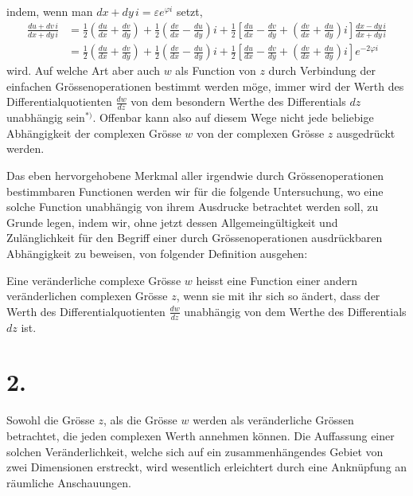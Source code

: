 \documentclass{article}
\begin{document}
indem, wenn man $dx + dy\,i = \varepsilon e^{\varphi i}$ setzt,
\[
\begin{aligned}
\frac{du + dv\,i}{dx + dy\,i} &= \frac{1}{2}\left(\frac{du}{dx} + \frac{dv}{dy}\right) + \frac{1}{2}\left(\frac{dv}{dx} - \frac{du}{dy}\right)i + \frac{1}{2}\left[\frac{du}{dx} - \frac{dv}{dy} + \left(\frac{dv}{dx} + \frac{du}{dy}\right)i\right]\frac{dx - dy\,i}{dx + dy\,i} \\
&= \frac{1}{2}\left(\frac{du}{dx} + \frac{dv}{dy}\right) + \frac{1}{2}\left(\frac{dv}{dx} - \frac{du}{dy}\right)i + \frac{1}{2}\left[\frac{du}{dx} - \frac{dv}{dy} + \left(\frac{dv}{dx} + \frac{du}{dy}\right)i\right]e^{-2\varphi i}
\end{aligned}
\]
wird. Auf welche Art aber auch $w$ als Function von $z$ durch Verbindung der einfachen Grössenoperationen bestimmt werden möge, immer wird der Werth des Differentialquotienten $\frac{dw}{dz}$ von dem besondern Werthe des Differentials $dz$ unabhängig sein${}^{*)}$. Offenbar kann also auf diesem Wege nicht jede beliebige Abhängigkeit der complexen Grösse $w$ von der complexen Grösse $z$ ausgedrückt werden.

Das eben hervorgehobene Merkmal aller irgendwie durch Grössenoperationen bestimmbaren Functionen werden wir für die folgende Untersuchung, wo eine solche Function unabhängig von ihrem Ausdrucke betrachtet werden soll, zu Grunde legen, indem wir, ohne jetzt dessen Allgemeingültigkeit und Zulänglichkeit für den Begriff einer durch Grössenoperationen ausdrückbaren Abhängigkeit zu beweisen, von folgender Definition ausgehen:

Eine veränderliche complexe Grösse $w$ heisst eine Function einer andern veränderlichen complexen Grösse $z$, wenn sie mit ihr sich so ändert, dass der Werth des Differentialquotienten $\frac{dw}{dz}$ unabhängig von dem Werthe des Differentials $dz$ ist.

\section*{2.}

Sowohl die Grösse $z$, als die Grösse $w$ werden als veränderliche Grössen betrachtet, die jeden complexen Werth annehmen können. Die Auffassung einer solchen Veränderlichkeit, welche sich auf ein zusammenhängendes Gebiet von zwei Dimensionen erstreckt, wird wesentlich erleichtert durch eine Anknüpfung an räumliche Anschauungen.
\end{document}
